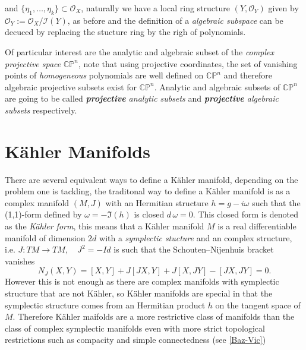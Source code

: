 \documentclass[12pt,twoside,a4paper]{report}
\newcommand{\cp}{\ensuremath{\mathbb{CP}}}
\newcommand{\osheaf}{\ensuremath{\mathcal O }}
\begin{document}
\noindent and $\lbrace\eta_1,\dots,\eta_k\rbrace\subset\osheaf_{X}$, naturally we have a local ring structure $(Y,\osheaf_{Y})$ given by $\osheaf_Y:=\osheaf_{X}/\mathcal{I}(Y)$, as before and the definition of a \emph{algebraic subspace} can be decuced by replacing the stucture ring by the righ of polynomials.

Of particular interest are the analytic and algebraic subset of the \emph{complex projective space} $\cp^{n}$, note that using projective coordinates, the set of vanishing points of \emph{homogeneous} polynomials are well defined on $\cp^n$ and therefore algebraic projective subsets exist for $\cp^{n}$. Analytic and algebraic subsets of $\cp^n$ are going to be called  \emph{\textbf{projective} analytic subsets} and \emph{\textbf{projective} algebraic subsets} respectively.


\section{Kähler Manifolds}
There are several equivalent ways to define a K\"ahler manifold, depending on the problem one is tackling, the traditonal way to define a Kähler manifold is as a complex manifold $(M,J)$ with an Hermitian structure $h=g-i\omega$ such that the (1,1)-form defined by $\omega=-\Im (h)$ is closed $d\,\omega=0$. This closed form is denoted as the \emph{K\"ahler form}, this means that a Kähler manifold $M$ is a real differentiable manifold of dimension $2d$ with a \emph{symplectic stucture} and an complex structure, i.e. $J:TM\rightarrow TM,\quad J^2=-Id$ is such that the Schouten–Nijenhuis bracket vanishes
\[
  N_{J}(X,Y)=[X,Y]+J[JX,Y]+J[X,JY]-[JX,JY]=0.
\]
However this is not enough as there are complex manifolds with symplectic structure that are not Kähler, so Kähler manifolds are special in that the symplectic structure comes from an Hermitian product $h$ on the tangent space of $M$. Therefore Kähler maifolds are a more restrictive class of manifolds than the class of complex symplectic manifolds even with more strict topological restrictions such as compacity and simple connectedness (see \ref{Baz-Vic})
\end{document}
